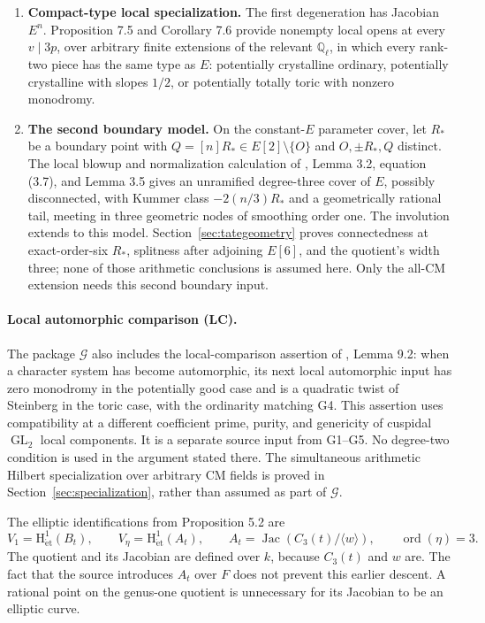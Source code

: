 \documentclass[11pt,a4paper]{article}
\theoremstyle{definition}\newtheorem{definition}[theorem]{Definition}
\theoremstyle{remark}\newtheorem*{remark}{Remark}
\newcommand{\Q}{\mathbb Q}\newcommand{\Z}{\mathbb Z}
\newcommand{\GL}{\operatorname{GL}}\newcommand{\SL}{\operatorname{SL}}
\newcommand{\Jac}{\operatorname{Jac}}\newcommand{\Spec}{\operatorname{Spec}}
\newcommand{\HH}{\mathrm H^1_{\mathrm{\acute et}}}
\newcommand{\srcM}{\cite{M}}
\newcommand{\Ginput}{\mathcal G}
\begin{document}
\begin{enumerate}[label=\textbf{G\arabic*.},leftmargin=40pt]
\item \textbf{Compact-type local specialization.}
The first degeneration has Jacobian $E^n$. Proposition 7.5 and Corollary 7.6
provide nonempty local opens at every $v\mid3p$, over arbitrary finite
extensions of the relevant $\Q_\ell$, in which every rank-two piece has the
same type as $E$: potentially crystalline ordinary, potentially crystalline
with slopes $1/2$, or potentially totally toric with nonzero monodromy.

\item \textbf{The second boundary model.}
On the constant-$E$ parameter cover, let $R_*$ be a boundary point with
$Q=[n]R_*\in E[2]\setminus\{O\}$ and $O,\pm R_*,Q$ distinct. The local
blowup and normalization calculation of \srcM, Lemma 3.2, equation (3.7),
and Lemma 3.5 gives an unramified degree-three cover of $E$, possibly
disconnected, with Kummer class $-2(n/3)R_*$ and a geometrically rational tail,
meeting in three geometric nodes of smoothing order one. The involution
extends to this model. Section~\ref{sec:tategeometry} proves connectedness
at exact-order-six $R_*$, splitness after adjoining $E[6]$, and the quotient's
width three; none of those arithmetic conclusions is assumed here.
Only the all-CM extension needs this second boundary input.
\end{enumerate}

\paragraph{Local automorphic comparison (LC).}
The package $\Ginput$ also includes the local-comparison assertion of \srcM,
Lemma 9.2: when a character system has become automorphic, its next local
automorphic input has zero monodromy in the potentially good case and is a
quadratic twist of Steinberg in the toric case, with the ordinarity matching
G4. This assertion uses compatibility at a different coefficient prime, purity,
and genericity of cuspidal $\GL_2$ local components. It is a separate source
input from G1--G5. No degree-two condition is used in the argument stated
there. The simultaneous arithmetic Hilbert specialization over arbitrary CM
fields is proved in Section~\ref{sec:specialization}, rather than assumed
as part of $\Ginput$.

The elliptic identifications from Proposition 5.2 are
\[
 V_1=\HH(B_t),\qquad
 V_\eta=\HH(A_t),\qquad
 A_t=\Jac(C_3(t)/\langle w\rangle),\qquad \operatorname{ord}(\eta)=3.
\]
The quotient and its Jacobian are defined over \(k\), because \(C_3(t)\) and
\(w\) are. The fact that the source introduces \(A_t\) over \(F\) does not
prevent this earlier descent. A rational point on the genus-one quotient is
unnecessary for its Jacobian to be an elliptic curve.
\end{document}
